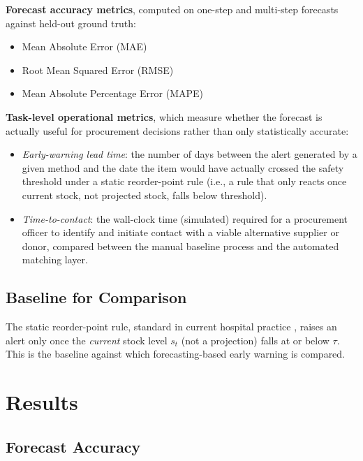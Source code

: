 \documentclass[conference]{IEEEtran}
\begin{document}
\textbf{Forecast accuracy metrics}, computed on one-step and multi-step forecasts against held-out ground truth:

\begin{itemize}
\item Mean Absolute Error (MAE)
\item Root Mean Squared Error (RMSE)
\item Mean Absolute Percentage Error (MAPE)
\end{itemize}

\textbf{Task-level operational metrics}, which measure whether the forecast is actually useful for procurement decisions rather than only statistically accurate:

\begin{itemize}
\item \emph{Early-warning lead time}: the number of days between the alert generated by a given method and the date the item would have actually crossed the safety threshold under a static reorder-point rule (i.e., a rule that only reacts once current stock, not projected stock, falls below threshold).
\item \emph{Time-to-contact}: the wall-clock time (simulated) required for a procurement officer to identify and initiate contact with a viable alternative supplier or donor, compared between the manual baseline process and the automated matching layer.
\end{itemize}

\subsection{Baseline for Comparison}

The static reorder-point rule, standard in current hospital practice \cite{b4}, raises an alert only once the \emph{current} stock level $s_t$ (not a projection) falls at or below $\tau$. This is the baseline against which forecasting-based early warning is compared.


\section{Results}

\subsection{Forecast Accuracy}
\end{document}
